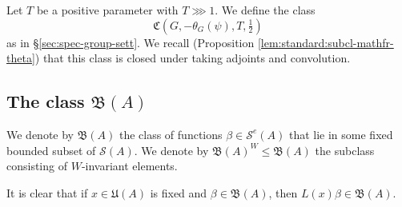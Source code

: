 Let $T$ be a positive parameter with $T \ggg 1$.  We define the class
\begin{equation*}
  \mathfrak{C}(G,-\theta_G(\psi),T,\tfrac{1}{2})
\end{equation*}
as in \S\ref{sec:spec-group-sett}.  We recall (Proposition \ref{lem:standard:subcl-mathfr-theta}) that this class is closed under taking adjoints and convolution.



\subsection{The class $\mathfrak{B}(A)$}\label{sec:class-mathfrakba}

\begin{definition}
  We denote by $\mathfrak{B}(A)$  the class of functions $\beta \in \mathcal{S}^e(A)$ that lie in some fixed bounded subset of $\mathcal{S}(A)$.  We denote by $\mathfrak{B}(A)^W \leq \mathfrak{B}(A)$ the subclass consisting of $W$-invariant elements.
\end{definition}

It is clear that if $x \in \mathfrak{U}(A)$ is fixed and $\beta \in \mathfrak{B}(A)$, then $L(x) \beta \in \mathfrak{B}(A)$.

